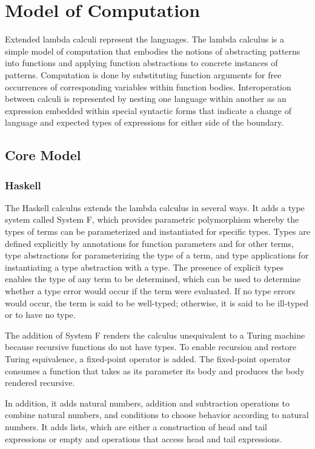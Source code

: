 \chapter{Model of Computation}

Extended lambda calculi represent the languages.  The lambda calculus is a simple model of computation that embodies the notions of abstracting patterns into functions and applying function abstractions to concrete instances of patterns.  Computation is done by substituting function arguments for free occurrences of corresponding variables within function bodies.  Interoperation between calculi is represented by nesting one language within another as an expression embedded within special syntactic forms that indicate a change of language and expected types of expressions for either side of the boundary.

\section{Core Model}

\subsection{Haskell}

The Haskell calculus extends the lambda calculus in several ways.  It adds a type system called System F, which provides parametric polymorphism whereby the types of terms can be parameterized and instantiated for specific types.  Types are defined explicitly by annotations for function parameters and for other terms, type abstractions for parameterizing the type of a term, and type applications for instantiating a type abstraction with a type.  The presence of explicit types enables the type of any term to be determined, which can be used to determine whether a type error would occur if the term were evaluated.  If no type errors would occur, the term is said to be well-typed; otherwise, it is said to be ill-typed or to have no type.

The addition of System F renders the calculus unequivalent to a Turing machine because recursive functions do not have types.  To enable recursion and restore Turing equivalence, a fixed-point operator is added.  The fixed-point operator consumes a function that takes as its parameter its body and produces the body rendered recursive.

In addition, it adds natural numbers, addition and subtraction operations to combine natural numbers, and conditions to choose behavior according to natural numbers.  It adds lists, which are either a construction of head and tail expressions or empty and operations that access head and tail expressions.

